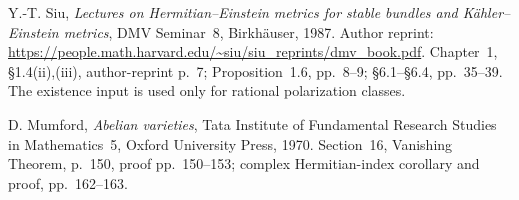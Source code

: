 Y.-T. Siu,
\emph{Lectures on Hermitian--Einstein metrics for stable bundles and
K\"ahler--Einstein metrics}, DMV Seminar~8, Birkh\"auser, 1987.
Author reprint: \url{https://people.math.harvard.edu/~siu/siu_reprints/dmv_book.pdf}.
Chapter~1, \S1.4(ii),(iii), author-reprint p.~7;
Proposition~1.6, pp.~8--9; \S6.1--\S6.4, pp.~35--39.
The existence input is used only for rational polarization classes.

D. Mumford, \emph{Abelian varieties}, Tata Institute of Fundamental
Research Studies in Mathematics~5, Oxford University Press, 1970.
Section~16, Vanishing Theorem, p.~150, proof pp.~150--153;
complex Hermitian-index corollary and proof, pp.~162--163.
